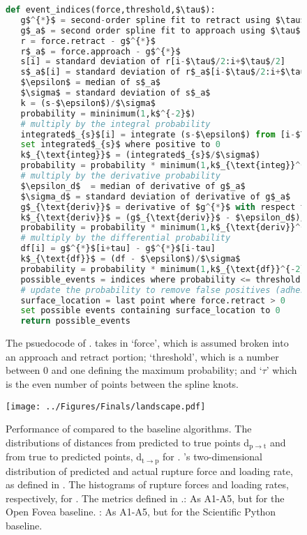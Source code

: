 \begin{figure}[htp]
\caption[\name{} psuedocode]{\noindent{}\pStartF The psuedocode of \name{}. \name{} takes in `force', which is assumed broken into an approach and retract portion; `threshold', which is a number between 0 and one defining the maximum probability; and `$\tau$' which is the even number of points between the spline knots. \pEndF }
  \begin{lstlisting}[language=Python]
def event_indices(force,threshold,$\tau$):
   g$^{*}$ = second-order spline fit to retract using $\tau$ for knots
   g$_a$ = second order spline fit to approach using $\tau$ for knots
   r = force.retract - g$^{*}$
   r$_a$ = force.approach - g$^{*}$
   s[i] = standard deviation of r[i-$\tau$/2:i+$\tau$/2]
   s$_a$[i] = standard deviation of r$_a$[i-$\tau$/2:i+$\tau$/2]
   $\epsilon$ = median of s$_a$
   $\sigma$ = standard deviation of s$_a$
   k = (s-$\epsilon$)/$\sigma$
   probability = mininimum(1,k$^{-2}$)
   # multiply by the integral probability 
   integrated$_{s}$[i] = integrate (s-$\epsilon$) from [i-$\tau$] to [i+$\tau$]
   set integrated$_{s}$ where positive to 0
   k$_{\text{integ}}$ = (integrated$_{s}$/$\sigma$)
   probability = probability * minimum(1,k$_{\text{integ}}^{-2}$)
   # multiply by the derivative probability
   $\epsilon_d$  = median of derivative of g$_a$
   $\sigma_d$ = standard deviation of derivative of g$_a$
   g$_{\text{deriv}}$ = derivative of $g^{*}$ with respect to time
   k$_{\text{deriv}}$ = (g$_{\text{deriv}}$ - $\epsilon_d$)/$\sigma_d$
   probability = probability * minimum(1,k$_{\text{deriv}}^{-2}$)
   # multiply by the differential probability 
   df[i] = g$^{*}$[i+tau] - g$^{*}$[i-tau]
   k$_{\text{df}}$ = (df - $\epsilon$)/$\sigma$
   probability = probability * minimum(1,k$_{\text{df}}^{-2}$)
   possible_events = indices where probability <= threshold
   # update the probability to remove false positives (adhesions)
   surface_location = last point where force.retract > 0
   set possible events containing surface_location to 0
   return possible_events
\end{lstlisting}
\end{figure}


\begin{figure}[htpb]
\caption[Algorithm Performance]{\noindent{}\pStartF Performance of \name{} compared to the baseline algorithms.  The distributions of distances from predicted to true points d$_{\mathrm{p}\rightarrow\mathrm{t}}$ and from true to predicted points, d$_{\mathrm{t}\rightarrow\mathrm{p}}$ for \name{}.  \name{}'s two-dimensional distribution of predicted and actual rupture force and loading rate, as defined in .  The histograms of rupture forces and loading rates, respectively, for \name{}.   The metrics defined in .: As A1-A5, but for the Open Fovea baseline. : As A1-A5, but for the Scientific Python baseline. \pEndF }
\centering
\texttt{[image: ../Figures/Finals/landscape.pdf]}%
\end{figure}



